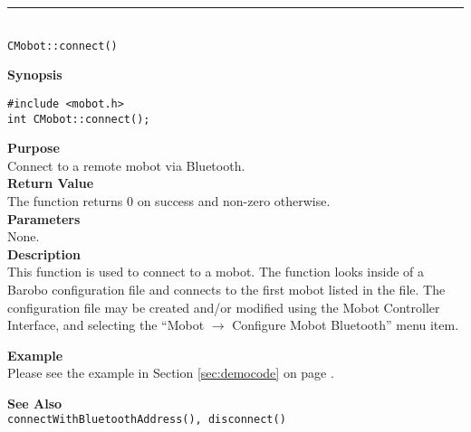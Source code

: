 \noindent
\vspace{5pt}
\rule{4.5in}{0.015in}\\
\noindent
{\LARGE \texttt{CMobot::connect()}}\\
{}

\noindent
{\bf Synopsis}
\vspace{-8pt}
\begin{verbatim}
#include <mobot.h>
int CMobot::connect();
\end{verbatim}

\noindent
{\bf Purpose}\\
Connect to a remote mobot via Bluetooth.\\

\noindent
{\bf Return Value}\\
The function returns 0 on success and non-zero otherwise.\\

\noindent
{\bf Parameters}\\
None.\\

\noindent
{\bf Description}\\
This function is used to connect to a mobot. The function looks inside of a 
Barobo configuration file and connects to the first mobot listed in the file.
The configuration file may be created and/or modified using the Mobot Controller
Interface, and selecting the ``Mobot $\rightarrow$ Configure Mobot Bluetooth'' menu item.

\noindent
{\bf Example}\\
Please see the example in Section \ref{sec:democode} on page \pageref{sec:democode}.\\
\noindent

\noindent
{\bf See Also}\\
\texttt{connectWithBluetoothAddress(), disconnect()}\\

